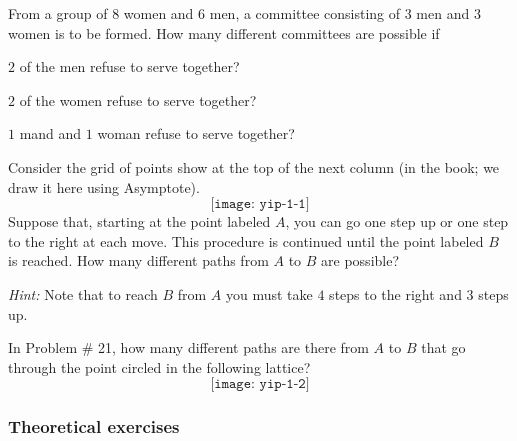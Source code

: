 \begin{problem}[Ross, \S 1, \# 19]
  From a group of \(8\) women and \(6\) men, a committee consisting of
  \(3\) men and \(3\) women is to be formed. How many different committees
  are possible if
  \begin{alphlist}
  \item \(2\) of the men refuse to serve together?
  \item \(2\) of the women refuse to serve together?
  \item \(1\) mand and \(1\) woman refuse to serve together?
  \end{alphlist}
\end{problem}
\begin{solution*}
\end{solution*}

\begin{problem}[Ross, \S 1, \# 21]
  Consider the grid of points show at the top of the next column (in the
  book; we draw it here using Asymptote).
  \[
    \texttt{[image: yip-1-1]}
  \]
  Suppose that, starting at the point labeled \(A\), you can go one step up
  or one step to the right at each move. This procedure is continued until
  the point labeled \(B\) is reached. How many different paths from \(A\)
  to \(B\) are possible?

  \noindent\emph{Hint:} Note that to reach \(B\) from \(A\) you must take
  \(4\) steps to the right and \(3\) steps up.
\end{problem}
\begin{solution*}
\end{solution*}

\begin{problem}[Ross, \S 1, \# 22]
  In Problem \# 21, how many different paths are there from \(A\) to \(B\)
  that go through the point circled in the following lattice?
  \[
    \texttt{[image: yip-1-2]}
  \]
\end{problem}
\begin{solution*}
\end{solution*}

\begin{problem}[Ross, \S 1, \# 33]
\end{problem}
\begin{solution*}
\end{solution*}

\subsubsection{Theoretical exercises}
\begin{problem}[Ross, \S 1, \# 5]
\end{problem}
\begin{solution*}
\end{solution*}

